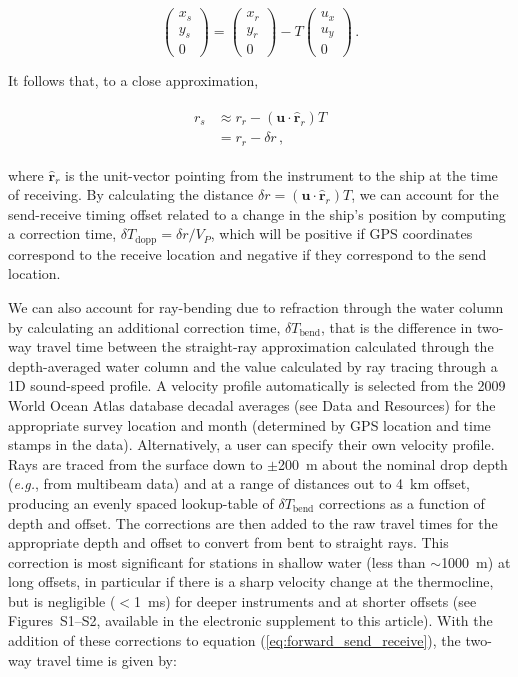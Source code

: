 \begin{equation}
\begin{pmatrix} x_s\\y_s\\0 \end{pmatrix} = \begin{pmatrix} x_r\\y_r\\0 \end{pmatrix} - T\begin{pmatrix} u_x\\u_y\\0 \end{pmatrix} \,.
\end{equation}

It follows that, to a close approximation,

\begin{align}
\begin{split}
r_s &\approx r_r - \left(\mathbf{u} \cdot \mathbf{\hat{r}}_r \right) T\\
	&= r_r - \delta r \,,
\end{split}	
\end{align}

where $\mathbf{\hat{r}}_r$ is the unit-vector pointing from the instrument to the ship at the time of receiving. By calculating the distance $\delta r = \left(\mathbf{u} \cdot \mathbf{\hat{r}}_r \right) T$, we can account for the send-receive timing offset related to a change in the ship's position by computing a correction time, $\delta T_{\text{dopp}} = \delta r/V_P$, which will be positive if GPS coordinates correspond to the receive location and negative if they correspond to the send location. 

We can also account for ray-bending due to refraction through the water column by calculating an additional correction time, $\delta T_{\text{bend}}$, that is the difference in two-way travel time between the straight-ray approximation calculated through the depth-averaged water column and the value calculated by ray tracing through a 1D sound-speed profile. A velocity profile automatically is selected from the 2009 World Ocean Atlas database decadal averages (see Data and Resources) for the appropriate survey location and month (determined by GPS location and time stamps in the data). Alternatively, a user can specify their own velocity profile. Rays are traced from the surface down to $\pm$200~m about the nominal drop depth (\textit{e.g.}, from multibeam data) and at a range of distances out to 4~km offset, producing an evenly spaced lookup-table of $\delta T_{\text{bend}}$ corrections as a function of depth and offset. The corrections are then added to the raw travel times for the appropriate depth and offset to convert from bent to straight rays. This correction is most significant for stations in shallow water (less than $\sim$1000~m) at long offsets, in particular if there is a sharp velocity change at the thermocline, but is negligible ($<$1~ms) for deeper instruments and at shorter offsets (see Figures~S1--S2, available in the electronic supplement to this article). With the addition of these corrections to equation (\ref{eq:forward_send_receive}), the two-way travel time is given by:

